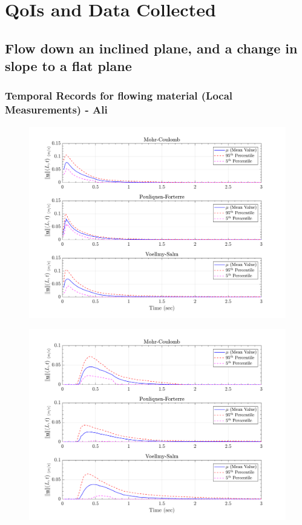 \documentclass{article}
\begin{document}
\section{QoIs and Data Collected}
\subsection{Flow down an inclined plane, and a change in slope to a flat plane}

\subsubsection{Temporal Records for flowing material (Local Measurements) - Ali}

\begin{figure}[H]
	\begin{minipage}[b]{0.5\linewidth}
    	\centering
    	\includegraphics[width=1\textwidth]{InclinedPlane/LocalRecords/Records/Vel_L1.png}
    	\label{fig:Ramp-L1-Vel}
	\end{minipage}
	\begin{minipage}[b]{0.5\linewidth}
		\centering
		\includegraphics[width=1\textwidth]{InclinedPlane/LocalRecords/Records/Vel_L8.png}
    	\label{fig:Ramp-L2-Vel}
    \end{minipage}
    

\end{figure}
\end{document}
